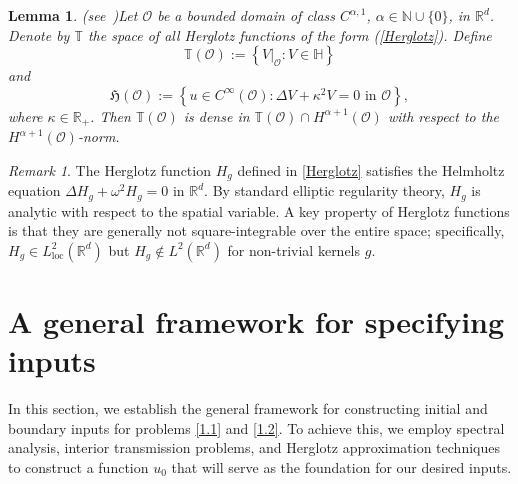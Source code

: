 \documentclass[11pt,reqno,oneside]{amsart}
\numberwithin{equation}{section}
\newtheorem{lemma}[theorem]{Lemma}
\theoremstyle{definition}
\theoremstyle{remark}
\newtheorem{remark}[theorem]{Remark}
\numberwithin{equation}{section}
\begin{document}
	\begin{lemma}(see~\cite{Weck})\label{Herglotz lemma}
		Let $\mathcal{O}$ be a bounded domain of class $C^{\alpha,1}$, $\alpha \in \mathbb{N} \cup \{0\}$, in $\mathbb{R}^d$. Denote by $\mathbb{T}$ the space of all Herglotz functions of the form (\ref{Herglotz}). Define
		\[
		\mathbb{T}(\mathcal{O}) := \left\{\left.V\right|_{\mathcal{O}} : V \in \mathbb{H}\right\}
		\]
		and
		\begin{equation*}\label{wave number}
			\mathfrak{H}(\mathcal{O}) := \left\{u \in C^{\infty}(\mathcal{O}) : \Delta V + \kappa^2 V = 0 \text{ in } \mathcal{O}\right\},
		\end{equation*}
		where $\kappa\in \mathbb R_+$. Then $\mathbb{T}(\mathcal{O})$ is dense in $\mathbb{T}(\mathcal{O}) \cap H^{\alpha+1}(\mathcal{O})$ with respect to the $H^{\alpha+1}(\mathcal{O})$-norm.
	\end{lemma}
	
	\begin{remark}\label{remark 2.3}
		The Herglotz function $H_g$ defined in \eqref{Herglotz} satisfies the Helmholtz equation $\Delta H_g + \omega^2 H_g = 0$ in $\mathbb{R}^d$. By standard elliptic regularity theory, $H_g$ is analytic with respect to the spatial variable. A key property of Herglotz functions is that they are generally not square-integrable over the entire space; specifically, $H_g \in L^{2}_{\text{loc}}(\mathbb{R}^d)$ but $H_g \notin L^{2}(\mathbb{R}^d)$ for non-trivial kernels $g$. 
	\end{remark}
	
	
	\section{A general framework for specifying inputs}\label{section 3}
	
	In this section, we establish the general framework for constructing initial and boundary inputs for problems \eqref{1.1} and \eqref{1.2}. To achieve this, we employ spectral analysis, interior transmission problems, and Herglotz approximation techniques to construct a function $u_0$ that will serve as the foundation for our desired inputs.
	
\end{document}
